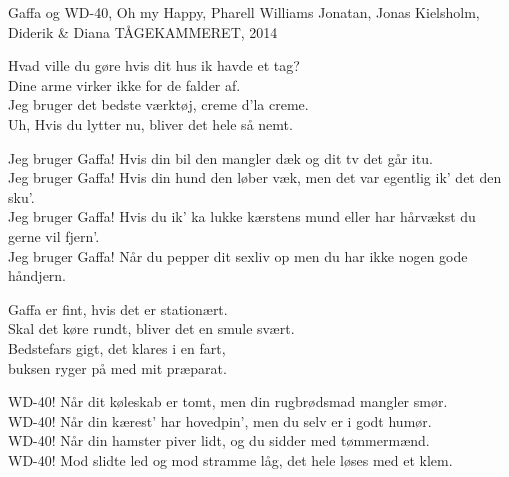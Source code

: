 \begin{song}{Gaffa og WD-40, Oh my}
  {} %
  {Happy, Pharell Williams} %
  {Jonatan, Jonas Kielsholm, Diderik \& Diana} %
  {TÅGEKAMMERET, 2014} %
  {\NotCCLIed} %

  \begin{SBVerse}
    Hvad ville du gøre hvis dit hus ik havde et tag?\\
    Dine arme virker ikke for de falder af.\\
    Jeg bruger det bedste værktøj, creme d’la creme.\\
    Uh, Hvis du lytter nu, bliver det hele så nemt.
  \end{SBVerse}

  \begin{SBChorus}
    Jeg bruger Gaffa! Hvis din bil den mangler dæk og dit tv det går itu.\\
    Jeg bruger Gaffa! Hvis din hund den løber væk, men det var egentlig ik’ det den sku’.\\
    Jeg bruger Gaffa! Hvis du ik’ ka lukke kærstens mund eller har hårvækst du gerne vil fjern’.\\
    Jeg bruger Gaffa! Når du pepper dit sexliv op men du har ikke nogen gode håndjern.
  \end{SBChorus}

  \begin{SBVerse}
    Gaffa er fint, hvis det er stationært.\\
    Skal det køre rundt, bliver det en smule svært.\\
    Bedstefars gigt, det klares i en fart,\\
    buksen ryger på med mit præparat.
  \end{SBVerse}

  \begin{SBChorus}
    WD-40! Når dit køleskab er tomt, men din rugbrødsmad mangler smør.\\
    WD-40! Når din kærest’ har hovedpin’, men du selv er i godt humør.\\
    WD-40! Når din hamster piver lidt, og du sidder med tømmermænd.\\
    WD-40! Mod slidte led og mod stramme låg, det hele løses med et klem.
  \end{SBChorus}


\end{song}
